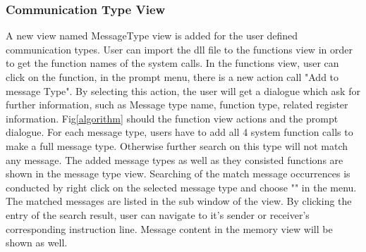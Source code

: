 \documentclass[paper=a4, fontsize=11pt]{scrartcl}
\numberwithin{equation}{section}		%
\numberwithin{figure}{section}			%
\numberwithin{table}{section}				%
\begin{document}
\subsubsection{Communication Type View}
A new view named MessageType view is added for the user defined communication types. User can import the dll file to the functions view in order to get the function names of the system calls. In the functions view, user can click on the function, in the prompt menu, there is a new action call "Add to message Type". By selecting this action, the user will get  a dialogue which ask for further information, such as Message type name, function type, related register information. Fig\ref{algorithm} should the function view actions and the prompt dialogue. For each message type, users have to add all 4 system function calls to make a full message type. Otherwise further search on this type will not match any message.
The added message types as well as they consisted functions are shown in the message type view. Searching of the match message occurrences is conducted by right click on the selected message type and choose "" in the menu. The matched messages are listed in the sub window of the view. By clicking the entry of the search  result, user can navigate to it's sender or receiver's corresponding instruction line. Message content in the memory view will be shown as well.
\end{document}
